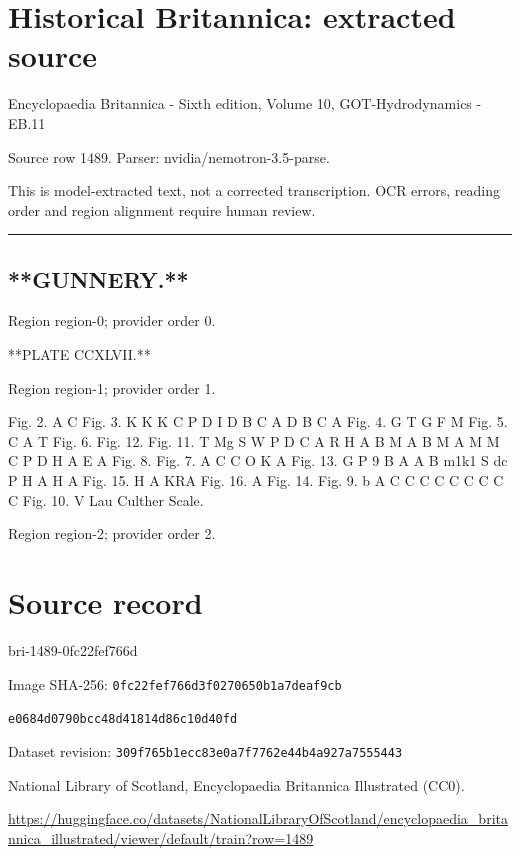 \documentclass[11pt]{article}
\begin{document}
\section*{Historical Britannica: extracted source}
Encyclopaedia Britannica - Sixth edition, Volume 10, GOT-Hydrodynamics - EB.11\par
{\small Source row 1489. Parser: nvidia/nemotron-3.5-parse.\par}
{\small This is model-extracted text, not a corrected transcription. OCR errors, reading order and region alignment require human review.\par}
\hrule\medskip
\subsection*{**GUNNERY.**}

{\scriptsize\color{gray} Region region-0; provider order 0.\par}
\medskip

**PLATE CCXLVII.**
\par

{\scriptsize\color{gray} Region region-1; provider order 1.\par}
\medskip

Fig. 2.
A
C
Fig. 3.
K
K
K
C
P
D
I
D
B
C
A
D
B
C
A
Fig. 4.
G
T
G
F
M
Fig. 5.
C
A
T
Fig. 6.
Fig. 12.
Fig. 11.
T
Mg
S
W
P
D C
A
R
H
A
B
M
A
B
M
A
M
M
C
P
D
H
A
E
A
Fig. 8.
Fig. 7.
A
C
C
O
K
A
Fig. 13.
G
P
9
B
A
A
B
m1k1
S
dc
P
H
A
H
A
Fig. 15.
H
A
KRA
Fig. 16.
A
Fig. 14.
Fig. 9.
b
A
C
C
C
C
C
C
C
C
C
Fig. 10.
V
Lau Culther Scale.
\par

{\scriptsize\color{gray} Region region-2; provider order 2.\par}
\medskip
\newpage\section*{Source record}
bri-1489-0fc22fef766d\par
Image SHA-256: \texttt{0fc22fef766d3f0270650b1a7deaf9cb}\par\texttt{e0684d0790bcc48d41814d86c10d40fd}\par
Dataset revision: \texttt{309f765b1ecc83e0a7f7}\texttt{762e44b4a927a7555443}\par
National Library of Scotland, Encyclopaedia Britannica Illustrated (CC0).\par
\url{https://huggingface.co/datasets/NationalLibraryOfScotland/encyclopaedia_britannica_illustrated/viewer/default/train?row=1489}
\end{document}
